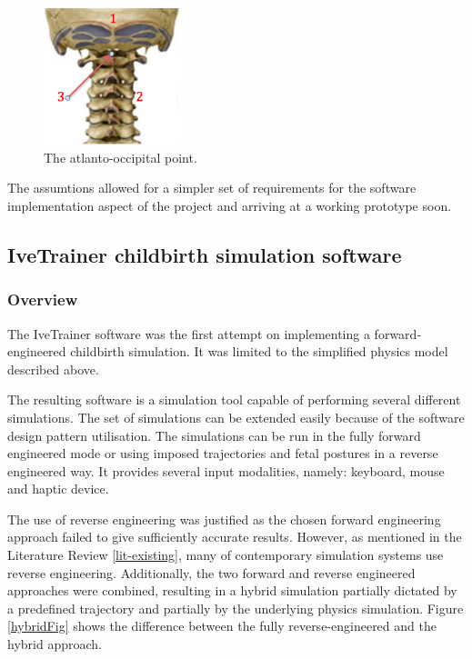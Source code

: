   \begin{figure}
  \begin{center}
  \includegraphics[width=40mm]{sections/methodology/images/basic/ao-point.png}
  \caption[The atlanto-occipital point.]{\label{contact} The atlanto-occipital point.}
  \end{center}
  \end{figure}

  The assumtions allowed for a simpler set of requirements for the software implementation aspect of the project and arriving at a working prototype soon.


\subsection{IveTrainer childbirth simulation software}

\subsubsection{Overview}

The IveTrainer software was the first attempt on implementing a forward-engineered childbirth simulation. It was limited to the simplified physics model described above.

The resulting software is a simulation tool capable of performing several different simulations. The set of simulations can be extended easily because of the software design pattern utilisation. The simulations can be run in the fully forward engineered mode or using imposed trajectories and fetal postures in a reverse engineered way. It provides several input modalities, namely: keyboard, mouse and haptic device.

The use of reverse engineering was justified as the chosen forward engineering approach failed to give sufficiently accurate results. However, as mentioned in the Literature Review \ref{lit-existing}, many of contemporary simulation systems use reverse engineering. Additionally, the two forward and reverse engineered approaches were combined, resulting in a hybrid simulation partially dictated by a predefined trajectory and partially by the underlying physics simulation. Figure \ref{hybridFig} shows the difference between the fully reverse-engineered and the hybrid approach.

